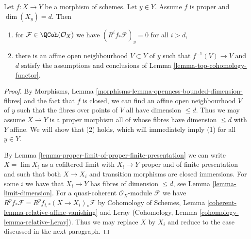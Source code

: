 \begin{lemma}
\label{lemma-higher-direct-images-zero-above-dimension-fibre}
Let $f : X \to Y$ be a morphism of schemes. Let $y \in Y$.
Assume $f$ is proper and $\dim(X_y) = d$.
Then
\begin{enumerate}
\item for $\mathcal{F} \in \QCoh(\mathcal{O}_X)$
we have $(R^if_*\mathcal{F})_y = 0$ for all $i > d$,
\item there is an affine open neighbourhood $V \subset Y$
of $y$ such that $f^{-1}(V) \to V$ and $d$ satisfy the
assumptions and conclusions of Lemma \ref{lemma-top-cohomology-functor}.
\end{enumerate}
\end{lemma}

\begin{proof}
By Morphisms, Lemma
\ref{morphisms-lemma-openness-bounded-dimension-fibres}
and the fact that $f$ is closed, we can find an affine open neighbourhood
$V$ of $y$ such that the fibres over points of $V$ all have dimension
$\leq d$. Thus we may assume $X \to Y$ is a proper morphism all
of whose fibres have dimension $\leq d$ with $Y$ affine.
We will show that (2) holds, which will immediately imply (1)
for all $y \in Y$.

\medskip\noindent
By Lemma \ref{lemma-proper-limit-of-proper-finite-presentation}
we can write $X = \lim X_i$ as a cofiltered limit with $X_i \to Y$ proper
and of finite presentation and such that both $X \to X_i$
and transition morphisms are closed immersions.
For some $i$ we have that $X_i \to Y$ has fibres of dimension $\leq d$,
see Lemma \ref{lemma-limit-dimension}.
For a quasi-coherent $\mathcal{O}_X$-module $\mathcal{F}$ we have
$R^pf_*\mathcal{F} = R^pf_{i, *}(X \to X_i)_*\mathcal{F}$ by
Cohomology of Schemes, Lemma \ref{coherent-lemma-relative-affine-vanishing}
and Leray (Cohomology, Lemma \ref{cohomology-lemma-relative-Leray}).
Thus we may replace $X$ by $X_i$ and
reduce to the case discussed in the next paragraph.


\end{proof}

